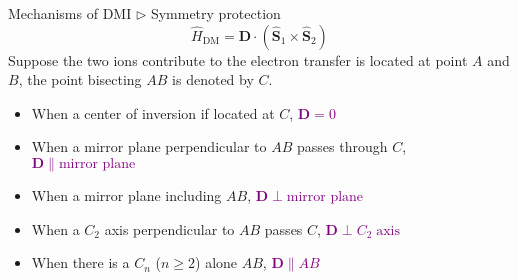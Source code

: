 \documentclass{beamer}
\newcommand{\purple}{\textcolor{purple}}
\begin{document}
  \begin{frame}{Mechanisms of DMI \(\rhd\) Symmetry protection}
    \begin{equation}
      \widehat{H}_{\text{DM}} = \bm{D}\cdot(\widehat{\bm{S}}_1\times\widehat{\bm{S}}_2)
    \end{equation}
    Suppose the two ions contribute to the electron transfer is located at point \(A\) and \(B\), the point bisecting \(AB\) is denoted by \(C\). 
    \begin{block}{}
      \begin{itemize}
        \item When a center of inversion if located at \(C\), \purple{\(\bm{D} = 0\)}
        \item When a mirror plane perpendicular to \(AB\) passes through \(C\), \purple{\(\bm{D}\parallel{}\text{mirror plane}\)}
        \item When a mirror plane including \(AB\), \purple{\(\bm{D}\perp{}\text{mirror plane}\)}
        \item When a \(C_2\) axis perpendicular to \(AB\) passes \(C\), \purple{\(\bm{D}\perp{}C_2\;\text{axis}\)}
        \item When there is a \(C_n\) (\(n\geq{}2\)) alone \(AB\), \purple{\(\bm{D}\parallel{}AB\)}
        
      \end{itemize} 
    \end{block}
  \end{frame}
\end{document}
